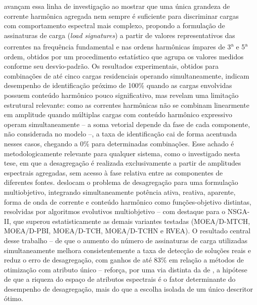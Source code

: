 \documentclass[times,final]{elsarticle}
\begin{document}
\citet{bouhouras2017} avançam essa linha de investigação ao mostrar que uma única grandeza de corrente harmônica agregada nem sempre é suficiente para discriminar cargas com comportamento espectral mais complexo, propondo a formulação de assinaturas de carga (\textit{load signatures}) a partir de valores representativos das correntes na frequência fundamental e nas ordens harmônicas ímpares de 3\textsuperscript{a} e 5\textsuperscript{a} ordem, obtidos por um procedimento estatístico que agrupa os valores medidos conforme seu desvio-padrão. Os resultados experimentais, obtidos para combinações de até cinco cargas residenciais operando simultaneamente, indicam desempenho de identificação próximo de 100\% quando as cargas envolvidas possuem conteúdo harmônico pouco significativo, mas revelam uma limitação estrutural relevante: como as correntes harmônicas não se combinam linearmente em amplitude quando múltiplas cargas com conteúdo harmônico expressivo operam simultaneamente -- a soma vetorial depende da fase de cada componente, não considerada no modelo --, a taxa de identificação cai de forma acentuada nesses casos, chegando a 0\% para determinadas combinações. Esse achado é metodologicamente relevante para qualquer sistema, como o investigado nesta tese, em que a desagregação é realizada exclusivamente a partir de amplitudes espectrais agregadas, sem acesso à fase relativa entre as componentes de diferentes fontes.
\citet{li2019moea} deslocam o problema de desagregação para uma formulação multiobjetivo, integrando simultaneamente potência ativa, reativa, aparente, forma de onda de corrente e conteúdo harmônico como funções-objetivo distintas, resolvidas por algoritmos evolutivos multiobjetivo -- com destaque para o NSGA-II, que superou estatisticamente as demais variantes testadas (MOEA/D-MTCH, MOEA/D-PBI, MOEA/D-TCH, MOEA/D-TCHN e RVEA). O resultado central desse trabalho -- de que o aumento do número de assinaturas de carga utilizadas simultaneamente melhora consistentemente a taxa de detecção de soluções reais e reduz o erro de desagregação, com ganhos de até 83\% em relação a métodos de otimização com atributo único -- reforça, por uma via distinta da de \citet{bouhouras2017}, a hipótese de que a riqueza do espaço de atributos espectrais é o fator determinante do desempenho de desagregação, mais do que a escolha isolada de um único descritor ótimo.
\end{document}
